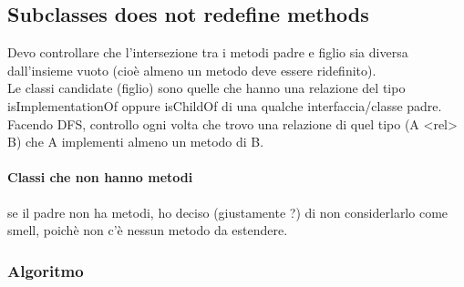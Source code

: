 \subsection{Subclasses does not redefine methods}
Devo controllare che l'intersezione tra i metodi padre e figlio sia diversa dall'insieme vuoto (cioè almeno un metodo deve essere ridefinito).\\
Le classi candidate (figlio) sono quelle che hanno una relazione del tipo isImplementationOf oppure isChildOf di una qualche interfaccia/classe padre. \\
Facendo DFS, controllo ogni volta che trovo una relazione di quel tipo (A <rel> B) che A implementi almeno un metodo di B.
\paragraph{Classi che non hanno metodi} se il padre non ha metodi, ho deciso (giustamente ?) di non considerlarlo come smell, poichè non c'è nessun metodo da estendere.  
\subsubsection*{Algoritmo}

